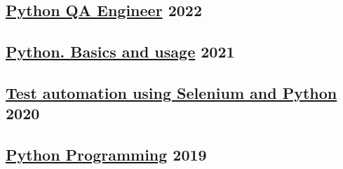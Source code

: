 \vspace*{10pt}

\subsection {\href {https://otus.ru/certificate/76b8da1ae26847fdab5ddfbc06c0ca59/en/}{Python QA Engineer} \hfill 2022}

\vspace*{5pt}

\subsection {\href{https://stepik.org/cert/1234026/}{Python. Basics and usage} \hfill 2021}

\vspace*{5pt}

\subsection {\href {https://stepik.org/cert/303434}{Test automation using Selenium and Python} \hfill 2020}

\vspace*{5pt}

\subsection {\href{https://stepik.org/cert/268482} {Python Programming} \hfill 2019}
